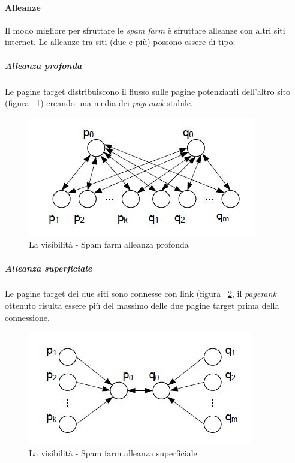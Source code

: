 				\paragraph{Alleanze}
					Il modo migliore per sfruttare le \emph{spam farm} è sfruttare alleanze con altri siti internet. Le alleanze tra siti (due e più) possono essere di tipo:
					\subparagraph{Alleanza profonda}
						Le pagine target distribuiscono il flusso sulle pagine potenzianti dell'altro sito (figura ~\ref{fig:LaVisibilita-SpamFarm2}) creando una media dei \emph{pagerank} stabile.
						
					\begin{figure} [h]
						\centering
						\includegraphics[scale=0.9]{images/LaVisibilita-SpamFarm2}
						\caption{La visibilità - Spam farm alleanza profonda}
						\label{fig:LaVisibilita-SpamFarm2}
					\end{figure}
						
					\subparagraph{Alleanza superficiale}
						Le pagine target dei due siti sono connesse con link (figura ~\ref{fig:LaVisibilita-SpamFarm3}, il \emph{pagerank} ottenuto risulta essere più del massimo delle due pagine target prima della connessione.
					
				\begin{figure} [h]
					\centering
					\includegraphics[scale=1]{images/LaVisibilita-SpamFarm3}
					\caption{La visibilità - Spam farm alleanza superficiale}
					\label{fig:LaVisibilita-SpamFarm3}
				\end{figure}
				
